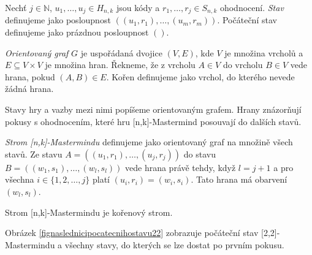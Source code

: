 \begin{definice}[Stav]\label{stav}
   Nechť $j \in \mathbb{N}$, $u_1, \dots , u_j \in H_{n,k}$ jsou kódy a $r_1, \dots, r_j \in S_{n,k}$ ohodnocení. \emph{Stav} definujeme jako posloupnost $((u_1, r_1), \dots, (u_m, r_m))$. Počáteční stav definujeme jako prázdnou posloupnost $()$.
\end{definice}


\begin{definice}
    \emph{Orientovaný graf} $G$ je uspořádaná dvojice $(V,E)$, kde $V$ je množina vrcholů a $E \subseteq V\times V$ je množina hran. 
    Řekneme, že z vrcholu $A \in V$ do vrcholu $B \in V$ vede hrana, pokud $(A,B) \in E$. Kořen definujeme jako vrchol, do kterého nevede žádná hrana. 
\end{definice}

Stavy hry a vazby mezi nimi popíšeme orientovaným grafem. Hrany znázorňují pokusy s ohodnocením, které hru [n,k]-Mastermind posouvají do dalších stavů. 
\begin{definice}
  \emph{Strom [n,k]-Mastermindu} definujeme jako orientovaný graf na množině všech stavů. Ze stavu $A = \left((u_1, r_1),\dots, (u_j,r_j)\right)$ do stavu $B = \left((w_1, s_1), \dots, (w_l,s_l)\right)$ vede hrana právě tehdy, když $l = j+1$ a pro všechna $ i \in \{1,2,\dots, j\}$ platí $ (u_i, r_i) = (w_i, s_i)$. Tato hrana má obarvení $(w_l, s_l)$. 
\end{definice}
\begin{pozn}
    Strom [n,k]-Mastermindu je kořenový strom.
\end{pozn}

Obrázek \ref{fignaslednicipocatecnihostavu22} zobrazuje počáteční stav [2,2]-Mastermindu a všechny stavy, do kterých se lze dostat po prvním pokusu. 


